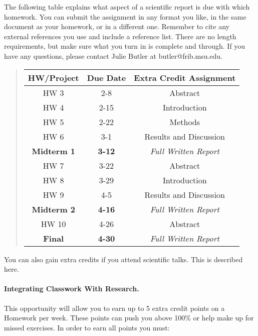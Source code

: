 \documentclass[%
oneside,                 %
final,                   %
10pt]{article}
\begin{document}
The following table explains what aspect of a scientific report is due
with which homework.  You can submit the assignment in any format you
like, in the same document as your homework, or in a different one.
Remember to cite any external references you use and include a
reference list.  There are no length requirements, but make sure what
you turn in is complete and through.  If you have any questions,
please contact Julie Butler at butler@frib.msu.edu.


\begin{quote}
\begin{tabular}{ccc}
\hline
\multicolumn{1}{c}{ HW/Project } & \multicolumn{1}{c}{ Due Date } & \multicolumn{1}{c}{ Extra Credit Assignment } \\
\hline
HW 3               & 2-8           & Abstract                   \\
HW 4               & 2-15          & Introduction               \\
HW 5               & 2-22          & Methods                    \\
HW 6               & 3-1           & Results and Discussion     \\
\textbf{Midterm 1} & \textbf{3-12} & \emph{Full Written Report} \\
HW 7               & 3-22          & Abstract                   \\
HW 8               & 3-29          & Introduction               \\
HW 9               & 4-5           & Results and Discussion     \\
\textbf{Midterm 2} & \textbf{4-16} & \emph{Full Written Report} \\
HW 10              & 4-26          & Abstract                   \\
\textbf{Final}     & \textbf{4-30} & \emph{Full Written Report} \\
\hline
\end{tabular}
\end{quote}

\noindent
You can also gain extra credits if you attend scientific talks.
This is described here.

\paragraph{Integrating Classwork With Research.}
This opportunity will allow you to earn up to 5 extra credit points on a Homework per week. These points can push you above 100\% or help make up for missed exercises.
In order to earn all points you must:
\end{document}
